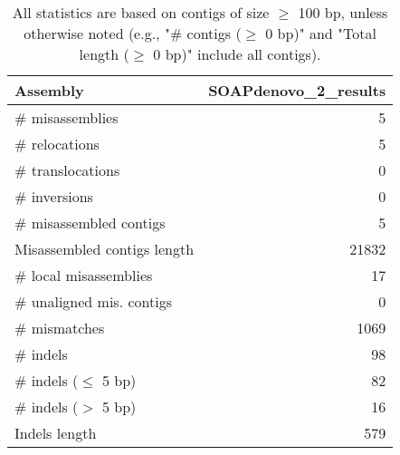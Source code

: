 \documentclass[12pt,a4paper]{article}
\begin{document}
\begin{table}[ht]
\begin{center}
\caption{All statistics are based on contigs of size $\geq$ 100 bp, unless otherwise noted (e.g., "\# contigs ($\geq$ 0 bp)" and "Total length ($\geq$ 0 bp)" include all contigs).}
\begin{tabular}{|l*{1}{|r}|}
\hline
Assembly & SOAPdenovo\_2\_results \\ \hline
\# misassemblies & 5 \\ \hline
\hspace{5mm}\# relocations & 5 \\ \hline
\hspace{5mm}\# translocations & 0 \\ \hline
\hspace{5mm}\# inversions & 0 \\ \hline
\# misassembled contigs & 5 \\ \hline
Misassembled contigs length & 21832 \\ \hline
\# local misassemblies & 17 \\ \hline
\# unaligned mis. contigs & 0 \\ \hline
\# mismatches & 1069 \\ \hline
\# indels & 98 \\ \hline
\hspace{5mm}\# indels ($\leq$ 5 bp) & 82 \\ \hline
\hspace{5mm}\# indels ($>$ 5 bp) & 16 \\ \hline
Indels length & 579 \\ \hline
\end{tabular}
\end{center}
\end{table}
\end{document}
